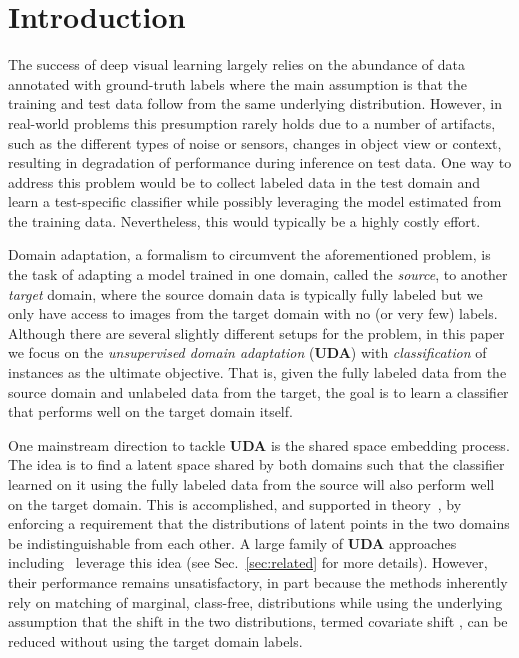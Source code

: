 \documentclass[10pt,letterpaper]{article}
\begin{document}
\section{Introduction}\label{sec:intro}

The success of deep visual learning largely relies on the abundance of data annotated with ground-truth labels where the main assumption is that the training and test data follow from the same underlying distribution. However, in real-world problems this presumption rarely holds due to a number of artifacts, such as the different types of noise or sensors, changes in object view or context, resulting in degradation of performance during inference on test data.  One way to address this problem would be to collect labeled data in the test domain and learn a test-specific classifier while possibly leveraging the model estimated from the training data.  Nevertheless, this would typically be a highly costly effort.

Domain adaptation, a formalism to circumvent the aforementioned problem, is the task of adapting a model trained in one domain, called the {\em source}, to another {\em target} domain, where the source domain data is typically fully labeled but we only have access to images from the target domain with no (or very few) labels. Although there are several slightly different setups for the problem, in this paper we focus on the {\em unsupervised domain adaptation} (\textbf{UDA}) with {\em classification} of instances as the ultimate objective.  That is, given the fully labeled data from the source domain and unlabeled data from the target, the goal is to learn a classifier that performs well on the target domain itself. 



One mainstream direction to tackle \textbf{UDA} is the shared space embedding process. The idea is to find a latent space shared by both domains such that the classifier learned on it using the fully labeled data from the source will also perform well on the target domain. This is accomplished, and supported in theory~\cite{ben-david-2007}, by enforcing a requirement that the distributions of latent points in the two domains be indistinguishable from each other. A large family of \textbf{UDA} approaches including~\cite{gopalan2011domain,gong2013connecting,baktashmotlagh2013unsupervised,ganin2014unsupervised,long2014transfer,kan2015bi,gholami2017punda,ming2015unsupervised,ghifary2016deep} leverage this idea (see Sec.~\ref{sec:related} for more details). However, their performance remains unsatisfactory, in part because the methods inherently rely on matching of marginal, class-free, distributions while using the underlying assumption that the shift in the two distributions, termed covariate shift \cite{sugiyama2008direct}, can be reduced without using the target domain labels. 
\end{document}
